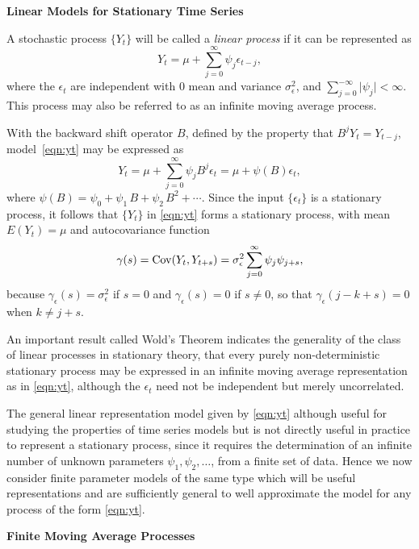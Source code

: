 \noindent\textbf{Linear Models for Stationary Time Series} \twomedskip


A stochastic process $\{ Y_t \}$ will be called a \emph{linear process} if it can be represented as
	\begin{equation} \label{eqn:yt}
          Y_t = \mu + \sum_{j=0}^{\infty}  \psi_j \epsilon_{t-j},
	\end{equation}
where the $\epsilon_t$ are independent with 0 mean and variance $\sigma^2_{\epsilon}$, and $\sum_{j=0}^{-\infty} \lvert \psi_j \rvert < \infty$. This process may also be referred to as an infinite moving average process.


With the backward shift operator $B$, defined by the property that $B^j Y_t = Y_{t-j}$, model~\eqref{eqn:yt} may be expressed as
	\[
	Y_t = \mu + \sum_{j=0}^{\infty} \psi_j B^j \epsilon_t = \mu + \psi(B) \epsilon_t,
	\]
where $\psi(B) = \psi_0 + \psi_1 \, B + \psi_2 \, B^2 + \cdots$. Since the input $\{\epsilon_t\}$ is a stationary process, it follows that $\{ Y_t \}$ in \eqref{eqn:yt} forms a stationary process, with mean $E(Y_t)=\mu$ and autocovariance function
	\begin{equation} \label{eqn:covyt}
	\gamma(s)= \cov(Y_t, Y_{t+s})= \sigma^2_{\epsilon} \sum_{j=0}^{\infty} \psi_j \psi_{j+s},
	\end{equation}      
because $\gamma_\epsilon(s) = \sigma^2_\epsilon$ if $s=0$ and $\gamma_\epsilon(s) = 0$ if $s \neq 0$, so that $\gamma_\epsilon(j - k + s) = 0$ when $k \neq j + s$.
	

An important result called Wold's Theorem indicates the generality of the class of linear processes in stationary theory, that every purely non-deterministic stationary process may be expressed in an infinite moving average representation as in \eqref{eqn:yt}, although the $\epsilon_t$ need not be independent but merely uncorrelated.	


The general linear representation model given by \eqref{eqn:yt} although useful for studying the properties of time series models but is not directly useful in practice to represent a stationary process, since it requires the determination of an infinite number of unknown parameters $\psi_1, \psi_2, \ldots$, from a finite set of data. Hence we now consider finite parameter models of the same type which will be useful representations and are sufficiently general to well approximate the model for any process of the form \eqref{eqn:yt}. \twomedskip


\noindent \textbf{Finite Moving Average Processes} \twomedskip


